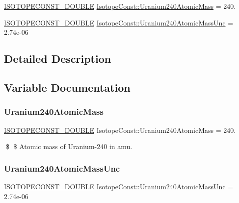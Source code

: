\begin{DoxyCompactItemize}
\item 
\mbox{\hyperlink{group___isotope_const-_macros_ga8f45a7272ce02c0b4c65c44636ed719a}{I\+S\+O\+T\+O\+P\+E\+C\+O\+N\+S\+T\+\_\+\+D\+O\+U\+B\+LE}} \mbox{\hyperlink{group___isotope_const-_uranium-_u240_ga80d4f9e0b4bfea06462819ec23300e82}{Isotope\+Const\+::\+Uranium240\+Atomic\+Mass}} = 240.
\item 
\mbox{\hyperlink{group___isotope_const-_macros_ga8f45a7272ce02c0b4c65c44636ed719a}{I\+S\+O\+T\+O\+P\+E\+C\+O\+N\+S\+T\+\_\+\+D\+O\+U\+B\+LE}} \mbox{\hyperlink{group___isotope_const-_uranium-_u240_gac8b5b4769f15e4966c8061ea6991ad46}{Isotope\+Const\+::\+Uranium240\+Atomic\+Mass\+Unc}} = 2.\+74e-\/06
\end{DoxyCompactItemize}


\subsection{Detailed Description}


\subsection{Variable Documentation}
\mbox{\label{group___isotope_const-_uranium-_u240_ga80d4f9e0b4bfea06462819ec23300e82}} 
\subsubsection{\texorpdfstring{Uranium240\+Atomic\+Mass}{Uranium240AtomicMass}}
{\footnotesize\ttfamily \mbox{\hyperlink{group___isotope_const-_macros_ga8f45a7272ce02c0b4c65c44636ed719a}{I\+S\+O\+T\+O\+P\+E\+C\+O\+N\+S\+T\+\_\+\+D\+O\+U\+B\+LE}} Isotope\+Const\+::\+Uranium240\+Atomic\+Mass = 240.}

\$ \$ Atomic mass of Uranium-\/240 in amu. \mbox{\label{group___isotope_const-_uranium-_u240_gac8b5b4769f15e4966c8061ea6991ad46}} 
\subsubsection{\texorpdfstring{Uranium240\+Atomic\+Mass\+Unc}{Uranium240AtomicMassUnc}}
{\footnotesize\ttfamily \mbox{\hyperlink{group___isotope_const-_macros_ga8f45a7272ce02c0b4c65c44636ed719a}{I\+S\+O\+T\+O\+P\+E\+C\+O\+N\+S\+T\+\_\+\+D\+O\+U\+B\+LE}} Isotope\+Const\+::\+Uranium240\+Atomic\+Mass\+Unc = 2.\+74e-\/06}

